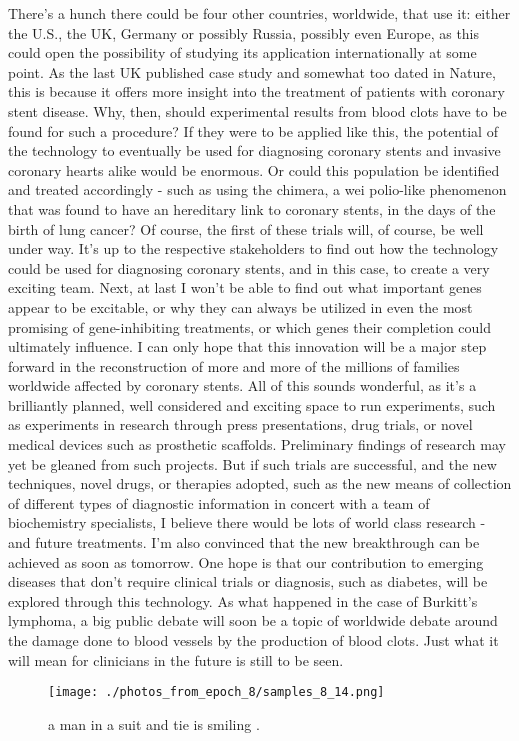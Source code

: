 \documentclass{article}%
\begin{document}
There's a hunch there could be four other countries, worldwide, that use it: either the U.S., the UK, Germany or possibly Russia, possibly even Europe, as this could open the possibility of studying its application internationally at some point. As the last UK published case study and somewhat too dated in Nature, this is because it offers more insight into the treatment of patients with coronary stent disease.\newline%
Why, then, should experimental results from blood clots have to be found for such a procedure?\newline%
If they were to be applied like this, the potential of the technology to eventually be used for diagnosing coronary stents and invasive coronary hearts alike would be enormous. Or could this population be identified and treated accordingly {-} such as using the chimera, a wei polio{-}like phenomenon that was found to have an hereditary link to coronary stents, in the days of the birth of lung cancer?\newline%
Of course, the first of these trials will, of course, be well under way. It's up to the respective stakeholders to find out how the technology could be used for diagnosing coronary stents, and in this case, to create a very exciting team.\newline%
Next, at last I won't be able to find out what important genes appear to be excitable, or why they can always be utilized in even the most promising of gene{-}inhibiting treatments, or which genes their completion could ultimately influence. I can only hope that this innovation will be a major step forward in the reconstruction of more and more of the millions of families worldwide affected by coronary stents.\newline%
All of this sounds wonderful, as it's a brilliantly planned, well considered and exciting space to run experiments, such as experiments in research through press presentations, drug trials, or novel medical devices such as prosthetic scaffolds.\newline%
Preliminary findings of research may yet be gleaned from such projects. But if such trials are successful, and the new techniques, novel drugs, or therapies adopted, such as the new means of collection of different types of diagnostic information in concert with a team of biochemistry specialists, I believe there would be lots of world class research {-} and future treatments.\newline%
I'm also convinced that the new breakthrough can be achieved as soon as tomorrow. One hope is that our contribution to emerging diseases that don't require clinical trials or diagnosis, such as diabetes, will be explored through this technology.\newline%
As what happened in the case of Burkitt's lymphoma, a big public debate will soon be a topic of worldwide debate around the damage done to blood vessels by the production of blood clots.\newline%
Just what it will mean for clinicians in the future is still to be seen.\newline%

%


\begin{figure}[h!]%
\centering%
\texttt{[image: ./photos\_from\_epoch\_8/samples\_8\_14.png]}%
\caption{a man in a suit and tie is smiling .}%
\end{figure}

%
\end{document}
